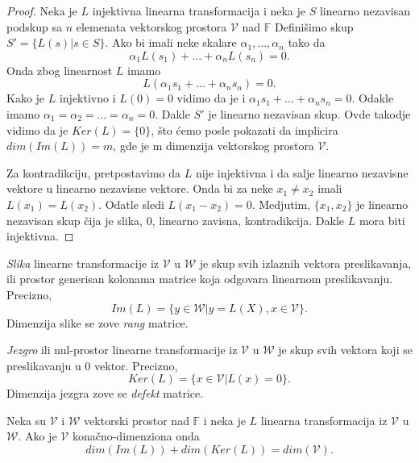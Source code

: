 \documentclass{article}
\begin{document}
\begin{proof}
  Neka je $L$ injektivna linearna transformacija i neka je $S$ linearno nezavisan podskup sa $n$ elemenata vektorskog prostora $\mathcal{V}$ nad $\mathbb{F}$
  Definišimo skup $S' = \{L(s) | s \in S\}$.
  Ako bi imali neke skalare $\alpha_1, \ldots,\alpha_n$ tako da
  \[\alpha_1 L(s_1) + \ldots + \alpha_n L(s_n) = 0.\]
  Onda zbog linearnost $L$ imamo
  \[L(\alpha_1 s_1 + \ldots + \alpha_n s_n) = 0.\]
  Kako je $L$ injektivno i $L(0) = 0$ vidimo da je i $\alpha_1 s_1 + \ldots + \alpha_n s_n = 0$.
  Odakle imamo $\alpha_1 = \alpha_2 = \ldots = \alpha_n = 0$.
  Dakle $S'$ je linearno nezavisan skup.
  Ovde takodje vidimo da je $Ker(L) = \{0\}$, što ćemo posle pokazati da implicira $dim(Im(L)) = m$, gde je m dimenzija vektorskog prostora $\mathcal{V}$.


  Za kontradikciju, pretpostavimo da $L$ nije injektivna i da salje linearno nezavisne vektore u linearno nezavisne vektore.
  Onda bi za neke $x_1 \neq x_2$ imali $L(x_1) = L(x_2)$.
  Odatle sledi $L(x_1 - x_2) = 0$.
  Medjutim, $\{x_1, x_2\}$ je linearno nezavisan skup čija je slika, $0$, linearno zavisna, kontradikcija.
  Dakle $L$ mora biti injektivna.
\end{proof}

\begin{definition}[Slika]
  \textit{Slika} linearne transformacije iz $\mathcal{V}$ u $\mathcal{W}$ je skup svih izlaznih vektora preslikavanja, ili prostor generisan kolonama matrice koja odgovara linearnom preslikavanju.
  Precizno, 
  \[Im(L) = \{y \in \mathcal{W} | y = L(X), x \in \mathcal{V}\}.\]
  Dimenzija slike se zove \textit{rang} matrice.
\end{definition}

\begin{definition}[Jezgro]
  \textit{Jezgro} ili nul-prostor linearne transformacije iz $\mathcal{V}$ u $\mathcal{W}$ je skup svih vektora koji se preslikavanju u $0$ vektor.
  Precizno, 
  \[Ker(L) = \{x \in \mathcal{V} | L(x) = 0\}.\]
  Dimenzija jezgra zove se \textit{defekt} matrice.
\end{definition}

\begin{theorem}
  Neka su $\mathcal{V}$ i $\mathcal{W}$ vektorski prostor nad $\mathbb{F}$ i neka je $L$ linearna transformacija iz $\mathcal{V}$ u $\mathcal{W}$.
  Ako je $\mathcal{V}$ konačno-dimenziona onda
  \[dim(Im(L)) + dim(Ker(L)) = dim(\mathcal{V}).\]
\end{theorem}
\end{document}
